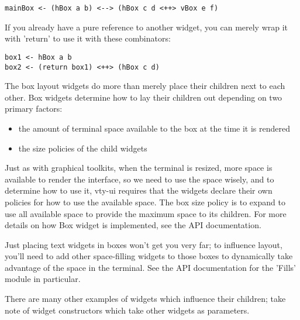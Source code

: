 \begin{verbatim}
mainBox <- (hBox a b) <--> (hBox c d <++> vBox e f)
\end{verbatim}

If you already have a pure reference to another widget, you can merely
wrap it with 'return' to use it with these combinators:

\begin{verbatim}
box1 <- hBox a b
box2 <- (return box1) <++> (hBox c d)
\end{verbatim}

The box layout widgets do more than merely place their children next to
each other.  Box widgets determine how to lay their children out
depending on two primary factors:

\begin{itemize}
\item the amount of terminal space available to the box at the time it
      is rendered
\item the size policies of the child widgets
\end{itemize}

Just as with graphical toolkits, when the terminal is resized, more
space is available to render the interface, so we need to use the space
wisely, and to determine how to use it, vty-ui requires that the widgets
declare their own policies for how to use the available space.  The box
size policy is to expand to use all available space to provide the
maximum space to its children.  For more details on how Box widget is
implemented, see the API documentation.

Just placing text widgets in boxes won't get you very far; to influence
layout, you'll need to add other space-filling widgets to those boxes to
dynamically take advantage of the space in the terminal.  See the API
documentation for the 'Fills' module in particular.

There are many other examples of widgets which influence their children;
take note of widget constructors which take other widgets as parameters.
